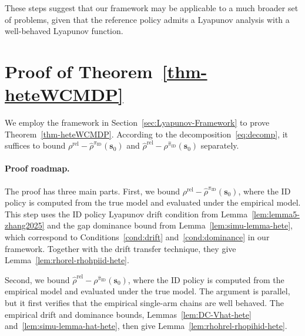 \documentclass[mnsc,nonblindrev]{informs3}
\newcommand{\piid}{\pi_{\mathrm{ID}}}
\newcommand{\pihid}{\widehat{\pi}_{\mathrm{ID}}}
\newcommand{\bms}{\bm{s}}
\begin{document}
These steps suggest that our framework may be applicable to a much broader set of problems, given that the reference policy admits a Lyapunov analysis with a well-behaved Lyapunov function.



\section{Proof of Theorem~\ref{thm-heteWCMDP}}\label{sec:proof_outline_thm_WCMDP}

We employ the framework in Section~\ref{sec:Lyapunov-Framework} to prove
Theorem~\ref{thm-heteWCMDP}. According to the decomposition~\eqref{eq:decomp},
it suffices to bound
\(\rho^{\mathrm{rel}}-\widehat\rho^{\piid}(\bms_0)\) and
\(\widehat\rho^{\mathrm{rel}}-\rho^{\pihid}(\bms_0)\) separately.

\paragraph{Proof roadmap.} The proof has three main parts. First, we bound
\(\rho^{\mathrm{rel}}-\widehat\rho^{\piid}(\bms_0)\), where the ID policy
is computed from the true model and evaluated under the empirical model.
This step uses the ID policy Lyapunov drift condition from
Lemma~\ref{lem:lemma5-zhang2025} and the gap dominance bound from
Lemma~\ref{lem:simu-lemma-hete}, which correspond to
Conditions~\ref{cond:drift} and~\ref{cond:dominance} in our framework.
Together with the drift transfer technique, they give
Lemma~\ref{lem:rhorel-rhohpiid-hete}.

Second, we bound
\(\widehat\rho^{\mathrm{rel}}-\rho^{\pihid}(\bms_0)\), where the ID policy
is computed from the empirical model and evaluated under the true model.
The argument is parallel, but it first verifies that the empirical
single-arm chains are well behaved. The empirical drift and dominance
bounds, Lemmas~\ref{lem:DC-Vhat-hete} and~\ref{lem:simu-lemma-hat-hete},
then give Lemma~\ref{lem:rhohrel-rhopihid-hete}.
\end{document}

